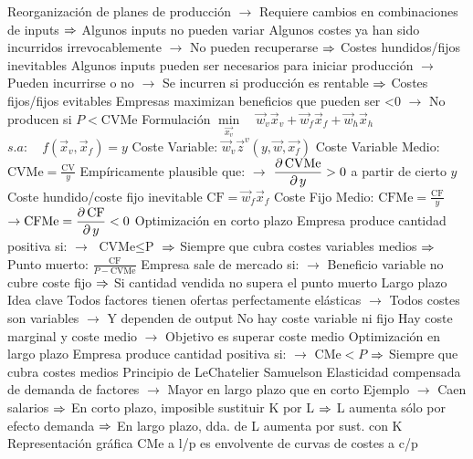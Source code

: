 \documentclass{nuevotema}
\begin{document}
\begin{esquemal}
				\4[] Reorganización de planes de producción
				\4[] $\to$ Requiere cambios en combinaciones de inputs
				\4[] $\Rightarrow$ Algunos inputs no pueden variar
				\4[] Algunos costes ya han sido incurridos irrevocablemente
				\4[] $\to$ No pueden recuperarse
				\4[] $\Rightarrow$ Costes hundidos/fijos inevitables
				\4[] Algunos inputs pueden ser necesarios para iniciar producción
				\4[] $\to$ Pueden incurrirse o no
				\4[] $\to$ Se incurren si producción es rentable
				\4[] $\Rightarrow$ Costes fijos/fijos evitables
				\4[] Empresas maximizan beneficios que pueden ser <0
				\4[] $\to$ No producen si $P<\text{CVMe}$
				\4 {Formulación}
				\4[] $\underset{\vec{x_v}}{\min} \quad \vec{w}_v \vec{x}_v + \vec{w}_f \vec{x}_f + \vec{w}_h \vec{x}_h$
				\4[] $s.a: \quad f(\vec{x}_v, \vec{x}_f) = y$
				\4 {Coste Variable:}
				\4[] $\vec{w}_v \vec{z}^v(y, \vec{w}, \vec{x_f})$
				\4[] Coste Variable Medio:
				\4[] $\text{CVMe} = \frac{\text{CV}}{y}$
				\4[] Empíricamente plausible que:
				\4[] $\to$ $\dfrac{\partial \, \text{CVMe}}{\partial \, y} > 0$ a partir de cierto $y$
				\4[] 
				\4 {Coste hundido/coste fijo inevitable}
				\4[] $\text{CF}=\vec{w}_f \vec{x}_f$
				\4[] Coste Fijo Medio: $\text{CFMe} = \frac{\text{CF}}{y}$
				\4[] $\to \text{CFMe} = \dfrac{\partial \, \text{CF}}{\partial \, y} < 0$
				\4[] 
				\4 Optimización en corto plazo
				\4[] Empresa produce cantidad positiva si:
				\4[] $\to$ $\text{CVMe} \leq \text{P}$
				\4[] $\Rightarrow$ Siempre que cubra costes variables medios
				\4[] $\Rightarrow$ Punto muerto: $\frac{\text{CF}}{P - \text{CVMe}}$
				\4[] Empresa sale de mercado si:
				\4[] $\to$ Beneficio variable no cubre coste fijo
				\4[] $\Rightarrow$ Si cantidad vendida no supera el punto muerto
			\3 Largo plazo
				\4 {Idea clave}
				\4[] Todos factores tienen ofertas perfectamente elásticas
				\4[] $\to$ Todos costes son variables
				\4[] $\to$ Y dependen de output
				\4 No hay coste variable ni fijo
				\4[] Hay coste marginal y coste medio
				\4[] $\to$ Objetivo es superar coste medio
				\4 Optimización en largo plazo
				\4[] Empresa produce cantidad positiva si:
				\4[] $\to$ $\text{CMe} < P$
				\4[] $\Rightarrow$ Siempre que cubra costes medios
				\4 Principio de LeChatelier Samuelson
				\4[] Elasticidad compensada de demanda de factores
				\4[] $\to$ Mayor en largo plazo que en corto
				\4[] Ejemplo
				\4[] $\to$ Caen salarios
				\4[] $\Rightarrow$ En corto plazo, imposible sustituir K por L
				\4[] $\Rightarrow$ L aumenta sólo por efecto demanda
				\4[] $\Rightarrow$ En largo plazo, dda. de L aumenta por sust. con K
			\3 Representación gráfica
				\4 CMe a l/p es envolvente de curvas de costes a c/p

\end{esquemal}
\end{document}
